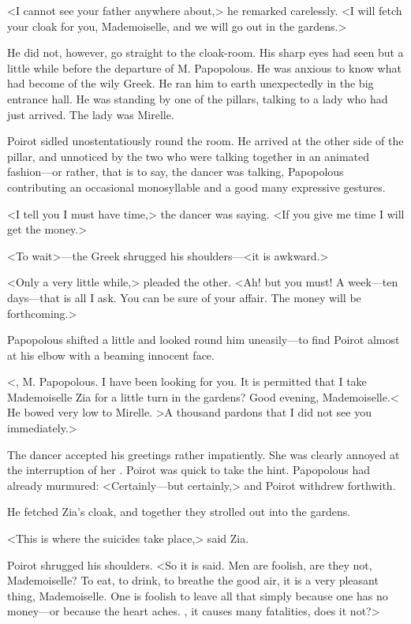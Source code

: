 <I cannot see your father anywhere about,> he remarked carelessly. <I will fetch your cloak for you, Mademoiselle, and we will go out in the gardens.>

He did not, however, go straight to the cloak-room. His sharp eyes had seen but a little while before the departure of M. Papopolous. He was anxious to know what had become of the wily Greek. He ran him to earth unexpectedly in the big entrance hall. He was standing by one of the pillars, talking to a lady who had just arrived. The lady was Mirelle.

Poirot sidled unostentatiously round the room. He arrived at the other side of the pillar, and unnoticed by the two who were talking together in an animated fashion—or rather, that is to say, the dancer was talking, Papopolous contributing an occasional monosyllable and a good many expressive gestures.

<I tell you I must have time,> the dancer was saying. <If you give me time I will get the money.>

<To wait>—the Greek shrugged his shoulders—<it is awkward.>

<Only a very little while,> pleaded the other. <Ah! but you must! A week—ten days—that is all I ask. You can be sure of your affair. The money will be forthcoming.>

Papopolous shifted a little and looked round him uneasily—to find Poirot almost at his elbow with a beaming innocent face.

<, M. Papopolous. I have been looking for you. It is permitted that I take Mademoiselle Zia for a little turn in the gardens? Good evening, Mademoiselle.< He bowed very low to Mirelle. >A thousand pardons that I did not see you immediately.>

The dancer accepted his greetings rather impatiently. She was clearly annoyed at the interruption of her . Poirot was quick to take the hint. Papopolous had already murmured: <Certainly—but certainly,> and Poirot withdrew forthwith.

He fetched Zia's cloak, and together they strolled out into the gardens.

<This is where the suicides take place,> said Zia.

Poirot shrugged his shoulders. <So it is said. Men are foolish, are they not, Mademoiselle? To eat, to drink, to breathe the good air, it is a very pleasant thing, Mademoiselle. One is foolish to leave all that simply because one has no money—or because the heart aches. , it causes many fatalities, does it not?>

